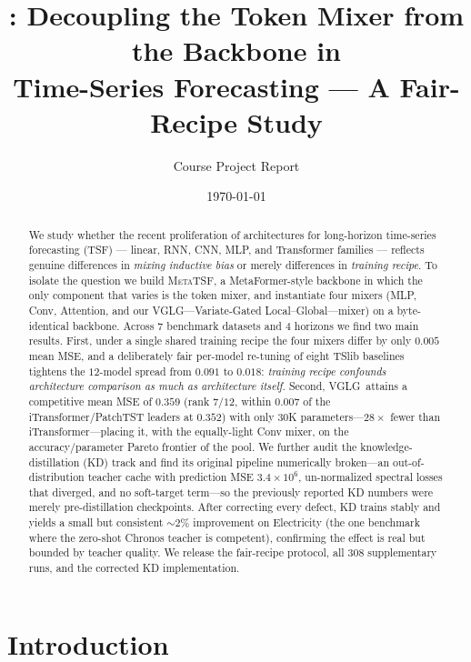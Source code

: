\documentclass[11pt]{article}
\title{\mtsf: Decoupling the Token Mixer from the Backbone in\\
Time-Series Forecasting --- A Fair-Recipe Study}
\author{Course Project Report}
\date{\today}
\newcommand{\mtsf}{\textsc{MetaTSF}}
\newcommand{\vglg}{\textsc{VGLG}}
\begin{document}
\maketitle

\begin{abstract}
We study whether the recent proliferation of architectures for long-horizon
time-series forecasting (TSF) --- linear, RNN, CNN, MLP, and Transformer
families --- reflects genuine differences in \emph{mixing inductive bias} or
merely differences in \emph{training recipe}. To isolate the question we build
\mtsf, a MetaFormer-style backbone in which the only component that varies is the
token mixer, and instantiate four mixers (MLP, Conv, Attention, and our
\vglg---Variate-Gated Local--Global---mixer) on a byte-identical backbone. Across
$7$ benchmark datasets and $4$ horizons we find two main results. First, under a
single shared training recipe the four mixers differ by only $0.005$ mean MSE,
and a deliberately fair per-model re-tuning of eight TSlib baselines tightens the
$12$-model spread from $0.091$ to $0.018$: \emph{training recipe confounds
architecture comparison as much as architecture itself.} Second, \vglg\ attains a
competitive mean MSE of $0.359$ (rank $7/12$, within $0.007$ of the
iTransformer/PatchTST leaders at $0.352$) with only $30$K parameters---$28\times$
fewer than iTransformer---placing it, with the equally-light Conv mixer, on the
accuracy/parameter Pareto frontier of the pool.
We further audit the knowledge-distillation (KD) track and find its original
pipeline numerically broken---an out-of-distribution teacher cache with prediction
MSE $3.4\times10^{6}$, un-normalized spectral losses that diverged, and no
soft-target term---so the previously reported KD numbers were merely
pre-distillation checkpoints. After correcting every defect, KD trains stably and
yields a small but consistent $\sim\!2\%$ improvement on Electricity (the one
benchmark where the zero-shot Chronos teacher is competent), confirming the effect
is real but bounded by teacher quality. We release the fair-recipe
protocol, all $308$ supplementary runs, and the corrected KD implementation.
\end{abstract}

\section{Introduction}
\end{document}
